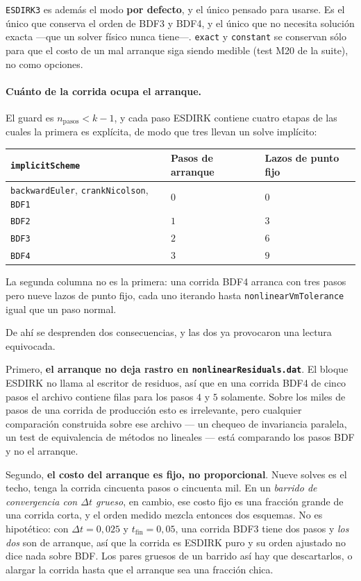 \documentclass[11pt,a4paper]{article}
\newcommand{\code}[1]{\texttt{\small #1}}
\begin{document}
\code{ESDIRK3} es además el modo \textbf{por defecto}, y el único pensado para usarse. Es el
único que conserva el orden de BDF3 y BDF4, y el único que no necesita solución exacta
---que un solver físico nunca tiene---. \code{exact} y \code{constant} se conservan sólo
para que el costo de un mal arranque siga siendo medible (test M20 de la suite), no como
opciones.

\paragraph{Cuánto de la corrida ocupa el arranque.} El guard es $n_{\text{pasos}}<k-1$, y
cada paso ESDIRK contiene cuatro etapas de las cuales la primera es explícita, de modo que
tres llevan un solve implícito:
\begin{center}
\begin{tabular}{@{}lll@{}}
\toprule
\code{implicitScheme} & Pasos de arranque & Lazos de punto fijo \\
\midrule
\code{backwardEuler}, \code{crankNicolson}, \code{BDF1} & $0$ & $0$ \\
\code{BDF2} & $1$ & $3$ \\
\code{BDF3} & $2$ & $6$ \\
\code{BDF4} & $3$ & $9$ \\
\bottomrule
\end{tabular}
\end{center}
La segunda columna no es la primera: una corrida BDF4 arranca con tres pasos pero nueve
lazos de punto fijo, cada uno iterando hasta \code{nonlinearVmTolerance} igual que un paso
normal.

De ahí se desprenden dos consecuencias, y las dos ya provocaron una lectura equivocada.

Primero, \textbf{el arranque no deja rastro en \code{nonlinearResiduals.dat}}. El bloque
ESDIRK no llama al escritor de residuos, así que en una corrida BDF4 de cinco pasos el
archivo contiene filas para los pasos $4$ y $5$ solamente. Sobre los miles de pasos de una
corrida de producción esto es irrelevante, pero cualquier comparación construida sobre ese
archivo --- un chequeo de invariancia paralela, un test de equivalencia de métodos no
lineales --- está comparando los pasos BDF y no el arranque.

Segundo, \textbf{el costo del arranque es fijo, no proporcional}. Nueve solves es el techo,
tenga la corrida cincuenta pasos o cincuenta mil. En un \emph{barrido de convergencia con
$\Delta t$ grueso}, en cambio, ese costo fijo es una fracción grande de una corrida corta, y
el orden medido mezcla entonces dos esquemas. No es hipotético: con $\Delta t=0{,}025$ y
$t_{\text{fin}}=0{,}05$, una corrida BDF3 tiene dos pasos y \emph{los dos} son de arranque,
así que la corrida es ESDIRK puro y su orden ajustado no dice nada sobre BDF. Los pares
gruesos de un barrido así hay que descartarlos, o alargar la corrida hasta que el arranque
sea una fracción chica.
\end{document}
